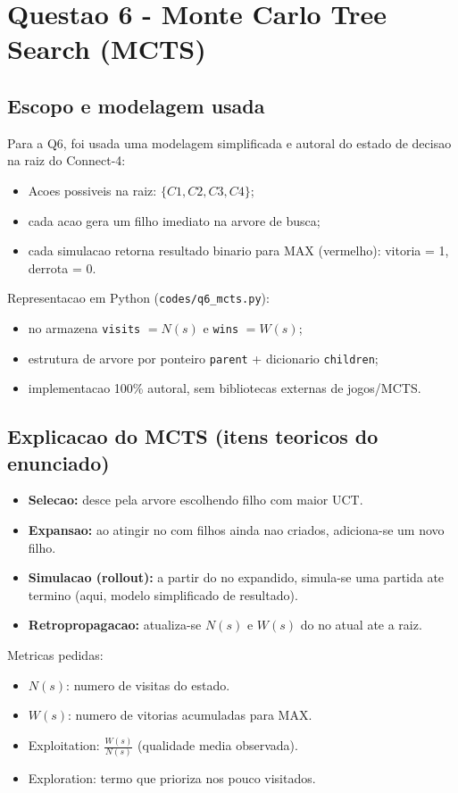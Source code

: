 \section{Questao 6 - Monte Carlo Tree Search (MCTS)}

\subsection{Escopo e modelagem usada}
Para a Q6, foi usada uma modelagem simplificada e autoral do estado de decisao na raiz do Connect-4:
\begin{itemize}[leftmargin=1.5em]
  \item Acoes possiveis na raiz: $\{C1,C2,C3,C4\}$;
  \item cada acao gera um filho imediato na arvore de busca;
  \item cada simulacao retorna resultado binario para MAX (vermelho): vitoria = 1, derrota = 0.
\end{itemize}

Representacao em Python (\texttt{codes/q6\_mcts.py}):
\begin{itemize}[leftmargin=1.5em]
  \item no armazena \texttt{visits} $=N(s)$ e \texttt{wins} $=W(s)$;
  \item estrutura de arvore por ponteiro \texttt{parent} + dicionario \texttt{children};
  \item implementacao 100\% autoral, sem bibliotecas externas de jogos/MCTS.
\end{itemize}

\subsection{Explicacao do MCTS (itens teoricos do enunciado)}
\begin{itemize}[leftmargin=1.5em]
  \item \textbf{Selecao:} desce pela arvore escolhendo filho com maior UCT.
  \item \textbf{Expansao:} ao atingir no com filhos ainda nao criados, adiciona-se um novo filho.
  \item \textbf{Simulacao (rollout):} a partir do no expandido, simula-se uma partida ate termino (aqui, modelo simplificado de resultado).
  \item \textbf{Retropropagacao:} atualiza-se $N(s)$ e $W(s)$ do no atual ate a raiz.
\end{itemize}

Metricas pedidas:
\begin{itemize}[leftmargin=1.5em]
  \item $N(s)$: numero de visitas do estado.
  \item $W(s)$: numero de vitorias acumuladas para MAX.
  \item Exploitation: $\frac{W(s)}{N(s)}$ (qualidade media observada).
  \item Exploration: termo que prioriza nos pouco visitados.
\end{itemize}

